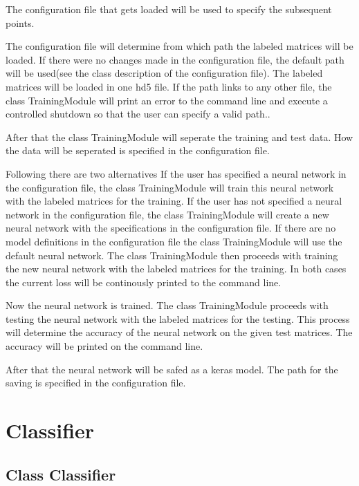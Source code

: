 \documentclass[parskip=full]{scrartcl}
\begin{document}
The configuration file that gets loaded will be used to specify the subsequent points.\newline

The configuration file will determine from which path the labeled matrices will be loaded.
If there were no changes made in the configuration file, the default path will be used(see the class description of the configuration file).
The labeled matrices will be loaded in one hd5 file. If the path links to any other file, the class TrainingModule will print an error to the command line and execute a controlled shutdown so that the user can specify a valid path.. \newline

After that the class TrainingModule will seperate the training and test data.
How the data will be seperated is specified in the configuration file.\newline

Following there are two alternatives
 If the user has specified a neural network in the configuration file, the class TrainingModule will train this neural network with the labeled matrices for the training.
If the user has not specified a neural network in the configuration file, the class TrainingModule will create a new neural network with the specifications in the configuration file.
If there are no model definitions in the configuration file the class TrainingModule will use the \gls{default neural network}.
The class TrainingModule then proceeds with training the new neural network with the labeled matrices for the training. In both cases the current loss will be continously printed to the command line.\newline

Now the neural network is trained. The class TrainingModule proceeds with testing the neural network with the labeled matrices for the testing.
This process will determine the accuracy of the neural network on the given test matrices.
The accuracy will be printed on the command line.\newline

After that the neural network will be safed as a keras model.
The path for the saving is specified in the configuration file.


\section{Classifier}
\subsection{Class Classifier}
\end{document}
